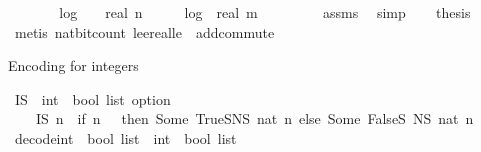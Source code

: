 \begin{isabellebody}
%
\isadelimproof
%
\endisadelimproof
%
\isatagproof
{}\isamarkupfalse%
\ {\isacharminus}{\kern0pt}\isanewline
\ \ \isamarkupfalse%
\ {\isachardoublequoteopen}{}\ {\isacharasterisk}{\kern0pt}\ log\ {}\ {\isacharparenleft}{\kern0pt}{}\ {\isacharplus}{\kern0pt}\ real\ n{\isacharparenright}{\kern0pt}\ {\isacharplus}{\kern0pt}\ {}\ {\isasymle}\ {}\ {\isacharasterisk}{\kern0pt}\ log\ {}\ {\isacharparenleft}{\kern0pt}{}{\isacharplus}{\kern0pt}real\ m{\isacharparenright}{\kern0pt}\ {\isacharplus}{\kern0pt}\ {}{\isachardoublequoteclose}\ \isanewline
\ \ \ \ \isamarkupfalse%
\ assms\ \isamarkupfalse%
\ simp\isanewline
\ \ \isamarkupfalse%
\ {\isacharquery}{\kern0pt}thesis\isanewline
\ \ \ \ \isamarkupfalse%
\ {\isacharparenleft}{\kern0pt}metis\ nat{\isacharunderscore}{\kern0pt}bit{\isacharunderscore}{\kern0pt}count\ le{\isacharunderscore}{\kern0pt}ereal{\isacharunderscore}{\kern0pt}le\ \ add{\isachardot}{\kern0pt}commute{\isacharparenright}{\kern0pt}\isanewline
{}\isamarkupfalse%
%
\endisatagproof
{\isafoldproof}%
%
\isadelimproof
%
\endisadelimproof
%
\begin{isamarkuptext}%
Encoding for integers%
\end{isamarkuptext}\isamarkuptrue%
\isamarkupfalse%
\ I\isactrlsub S\ {\isacharcolon}{\kern0pt}{\isacharcolon}{\kern0pt}\ {\isachardoublequoteopen}int\ {\isasymRightarrow}\ bool\ list\ option{\isachardoublequoteclose}\isanewline
\ \ \ \isanewline
\ \ \ \ {\isachardoublequoteopen}I\isactrlsub S\ n\ {\isacharequal}{\kern0pt}\ {\isacharparenleft}{\kern0pt}if\ n\ {\isasymge}\ {}\ then\ Some\ {\isacharbrackleft}{\kern0pt}True{\isacharbrackright}{\kern0pt}{\isacharat}{\kern0pt}\isactrlsub SN\isactrlsub S\ {\isacharparenleft}{\kern0pt}nat\ n{\isacharparenright}{\kern0pt}\ else\ Some\ {\isacharbrackleft}{\kern0pt}False{\isacharbrackright}{\kern0pt}{\isacharat}{\kern0pt}\isactrlsub S\ {\isacharparenleft}{\kern0pt}N\isactrlsub S\ {\isacharparenleft}{\kern0pt}nat\ {\isacharparenleft}{\kern0pt}{\isacharminus}{\kern0pt}n{\isacharminus}{\kern0pt}{}{\isacharparenright}{\kern0pt}{\isacharparenright}{\kern0pt}{\isacharparenright}{\kern0pt}{\isacharparenright}{\kern0pt}{\isachardoublequoteclose}\ \isanewline
\isanewline
{}\isamarkupfalse%
\ decode{\isacharunderscore}{\kern0pt}int\ {\isacharcolon}{\kern0pt}{\isacharcolon}{\kern0pt}\ {\isachardoublequoteopen}bool\ list\ {\isasymRightarrow}\ {\isacharparenleft}{\kern0pt}int\ {\isasymtimes}\ bool\ list{\isacharparenright}{\kern0pt}{\isachardoublequoteclose}\isanewline

\end{isabellebody}
